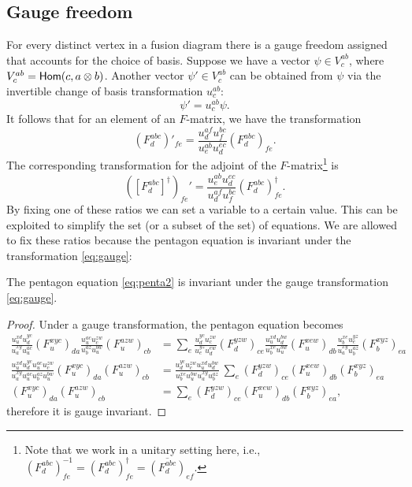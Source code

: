 {{{\subsection*{Gauge freedom}
	For every distinct vertex in a fusion diagram there is a gauge freedom assigned that accounts for the choice of basis. Suppose we have a vector $\psi\in V_c^{ab}$, where $V_c^{ab}=\mathsf{Hom}(c,a\otimes b)$. Another vector $\psi'\in V_c^{ab}$ can be obtained from $\psi$ via the invertible change of basis transformation $u_c^{ab}$:
		\begin{equation}
			\psi'=u_c^{ab}\psi.
		\end{equation}
	It follows that for an element of an $F$-matrix, we have the transformation
		\begin{equation}
		\label{eq:gauge}
			\left(F_d^{abc}\right)'_{fe}=\frac{u_d^{af} u_f^{bc}}{u_e^{ab} u_d^{ec}}\left(F_d^{abc}\right)_{fe}.
		\end{equation}
	The corresponding transformation for the adjoint of the $F$-matrix\footnote{Note that we work in a unitary setting here, i.e., $\left(F_d^{abc}\right)_{fe}^{-1}=\left(F_d^{abc}\right)^\dagger_{fe}=\overline{\left(F_d^{abc}\right)}_{ef}$.} is
		\begin{equation}
			\left(\left[F_d^{abc}\right]^\dagger\right)_{fe}'=\frac{u_e^{ab} u_d^{ec}}{u_d^{af} u_f^{bc}}\left(F_d^{abc}\right)^\dagger_{fe}.
		\end{equation}
	By fixing one of these ratios we can set a variable to a certain value. This can be exploited to simplify the set (or a subset of the set) of equations. We are allowed to fix these ratios because the pentagon equation is invariant under the transformation \cref{eq:gauge}:
		\begin{thm}
			The pentagon equation \cref{eq:penta2} is invariant under the gauge transformation \cref{eq:gauge}.
		\end{thm}
		\begin{proof}
			Under a gauge transformation, the pentagon equation becomes
			\begin{align}
				\frac{u_u^{xd}u_d^{yc}}{u_a^{xy}u_u^{ac}}\left(F_u^{xyc}\right)_{da}\frac{u_u^{ac}u_c^{zw}}{u_b^{az}u_u^{bw}}\left(F_u^{azw}\right)_{cb}&=\sum_e\frac{u_d^{yc}u_c^{zw}}{u_e^{yz}u_d^{ew}}\left(F_d^{yzw}\right)_{ce}\frac{u_u^{xd}u_d^{bw}}{u_b^{xe}u_u^{bw}}\left(F_u^{xew}\right)_{db}\frac{u_b^{xe}u_e^{yz}}{u_a^{xy}u_b^{az}}\left(F_b^{xyz}\right)_{ea}\\
				\frac{u_u^{xd}u_d^{yc}u_u^{ac}u_c^{zw}}{u_a^{xy}u_u^{ac}u_b^{az}u_u^{bw}}\left(F_u^{xyc}\right)_{da}\left(F_u^{azw}\right)_{cb}&=\frac{u_d^{yc}u_c^{zw}u_u^{xd}u_d^{bw}}{u_b^{xe}u_u^{bw}u_a^{xy}u_b^{az}}\ \sum_e\left(F_d^{yzw}\right)_{ce}\left(F_u^{xew}\right)_{db}\left(F_b^{xyz}\right)_{ea}\\
				\left(F_u^{xyc}\right)_{da}\left(F_u^{azw}\right)_{cb}&=\sum_e\left(F_d^{yzw}\right)_{ce}\left(F_u^{xew}\right)_{db}\left(F_b^{xyz}\right)_{ea},
			\end{align}
			therefore it is gauge invariant.
		\end{proof}

}}}
